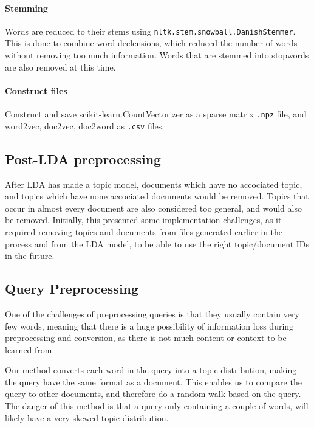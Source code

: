 \paragraph{Stemming}
Words are reduced to their stems using \texttt{nltk.stem.snowball.DanishStemmer}. 
This is done to combine word declensions, which reduced the number of words without removing too much information.
Words that are stemmed into stopwords are also removed at this time.

\paragraph{Construct files}
Construct and save scikit-learn.CountVectorizer as a sparse matrix \texttt{.npz} file, and word2vec, doc2vec, doc2word as \texttt{.csv} files.


\subsection{Post-LDA preprocessing}
After LDA has made a topic model, documents which have no accociated topic, and topics which have none accociated documents would be removed.
Topics that occur in almost every document are also considered too general, and would also be removed.
Initially, this presented some implementation challenges, as it required removing topics and documents from files generated earlier in the process and from the LDA model, to be able to use the right topic/document IDs in the future.

\subsection{Query Preprocessing}
One of the challenges of preprocessing queries is that they usually contain very few words, meaning that there is a huge possibility of information loss during preprocessing and conversion, as there is not much content or context to be learned from.

Our method converts each word in the query into a topic distribution, making the query have the same format as a document. 
This enables us to compare the query to other documents, and therefore do a random walk based on the query.
The danger of this method is that a query only containing a couple of words, will likely have a very skewed topic distribution.
